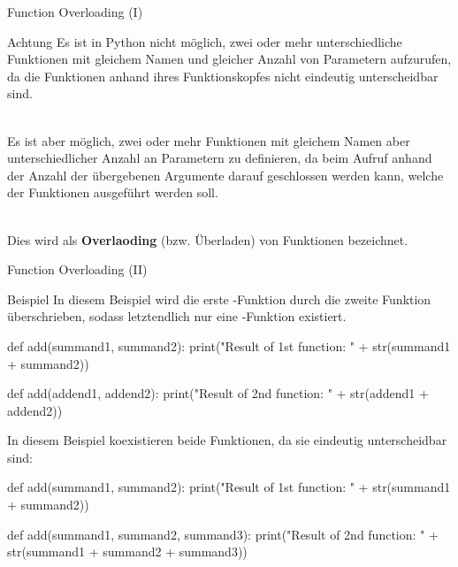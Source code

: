     
    \begin{frame}[fragile]{Function Overloading (I)}
        \begin{alertblock}{Achtung}
            Es ist in Python nicht möglich, zwei oder mehr unterschiedliche Funktionen mit gleichem Namen und gleicher Anzahl von Parametern aufzurufen, da die Funktionen anhand ihres Funktionskopfes nicht eindeutig unterscheidbar sind. \\~\
            
            Es ist aber möglich, zwei oder mehr Funktionen mit gleichem Namen aber unterschiedlicher Anzahl an Parametern zu definieren, da beim Aufruf anhand der Anzahl der übergebenen Argumente darauf geschlossen werden kann, welche der Funktionen ausgeführt werden soll. \\~\
            
            Dies wird als \textbf{Overlaoding} (bzw. Überladen) von Funktionen bezeichnet.
        \end{alertblock}
    \end{frame}
    
    \begin{frame}[fragile]{Function Overloading (II)}
        \begin{exampleblock}{Beispiel}
            In diesem Beispiel wird die erste -Funktion durch die zweite Funktion überschrieben, sodass letztendlich nur eine -Funktion existiert.
\begin{pythoncode}
def add(summand1, summand2):
    print("Result of 1st function: " + str(summand1 + summand2))

def add(addend1, addend2):
    print("Result of 2nd function: " + str(addend1 + addend2))
\end{pythoncode}

        In diesem Beispiel koexistieren beide Funktionen, da sie eindeutig unterscheidbar sind:
\begin{pythoncode}
def add(summand1, summand2):
    print("Result of 1st function: " + str(summand1 + summand2))

def add(summand1, summand2, summand3):
    print("Result of 2nd function: " + str(summand1 + summand2 + summand3))
\end{pythoncode}        
        \end{exampleblock}
    \end{frame}
    
